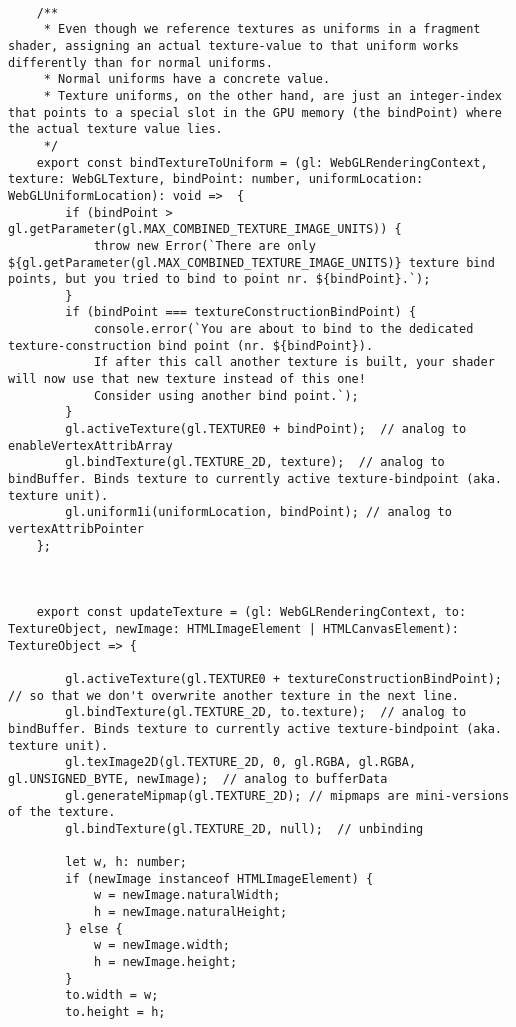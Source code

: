 \begin{lstlisting}
    
    /**
     * Even though we reference textures as uniforms in a fragment shader, assigning an actual texture-value to that uniform works differently than for normal uniforms.
     * Normal uniforms have a concrete value.
     * Texture uniforms, on the other hand, are just an integer-index that points to a special slot in the GPU memory (the bindPoint) where the actual texture value lies.
     */
    export const bindTextureToUniform = (gl: WebGLRenderingContext, texture: WebGLTexture, bindPoint: number, uniformLocation: WebGLUniformLocation): void =>  {
        if (bindPoint > gl.getParameter(gl.MAX_COMBINED_TEXTURE_IMAGE_UNITS)) {
            throw new Error(`There are only ${gl.getParameter(gl.MAX_COMBINED_TEXTURE_IMAGE_UNITS)} texture bind points, but you tried to bind to point nr. ${bindPoint}.`);
        }
        if (bindPoint === textureConstructionBindPoint) {
            console.error(`You are about to bind to the dedicated texture-construction bind point (nr. ${bindPoint}).
            If after this call another texture is built, your shader will now use that new texture instead of this one!
            Consider using another bind point.`);
        }
        gl.activeTexture(gl.TEXTURE0 + bindPoint);  // analog to enableVertexAttribArray
        gl.bindTexture(gl.TEXTURE_2D, texture);  // analog to bindBuffer. Binds texture to currently active texture-bindpoint (aka. texture unit).
        gl.uniform1i(uniformLocation, bindPoint); // analog to vertexAttribPointer
    };
    
    
    
    export const updateTexture = (gl: WebGLRenderingContext, to: TextureObject, newImage: HTMLImageElement | HTMLCanvasElement): TextureObject => {
    
        gl.activeTexture(gl.TEXTURE0 + textureConstructionBindPoint); // so that we don't overwrite another texture in the next line.
        gl.bindTexture(gl.TEXTURE_2D, to.texture);  // analog to bindBuffer. Binds texture to currently active texture-bindpoint (aka. texture unit).
        gl.texImage2D(gl.TEXTURE_2D, 0, gl.RGBA, gl.RGBA, gl.UNSIGNED_BYTE, newImage);  // analog to bufferData
        gl.generateMipmap(gl.TEXTURE_2D); // mipmaps are mini-versions of the texture.
        gl.bindTexture(gl.TEXTURE_2D, null);  // unbinding
    
        let w, h: number;
        if (newImage instanceof HTMLImageElement) {
            w = newImage.naturalWidth;
            h = newImage.naturalHeight;
        } else {
            w = newImage.width;
            h = newImage.height;
        }
        to.width = w;
        to.height = h;
    

\end{lstlisting}
